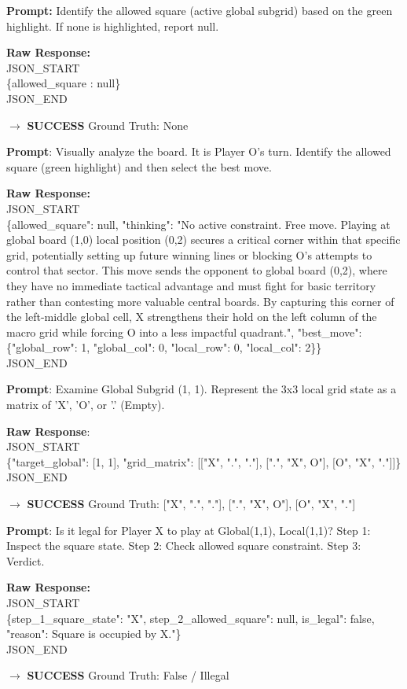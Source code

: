 \documentclass[12pt,a4paper]{article}
\begin{document}
	\begin{description}[leftmargin=3.5cm, style=sameline]
		\item [Allowed Square] \textbf{Prompt:} Identify the allowed square (active global subgrid) based on the green highlight. If none is highlighted, report null.
		\item \textbf{Raw Response:} \\ JSON\_START	\\ \{\dq allowed\_square \dq: null\} \\ JSON\_END
		\item $\rightarrow$ \textbf{SUCCESS} Ground Truth: None
		
		\newpage
		\item [Move] \textbf{Prompt}: Visually analyze the board. It is Player O's turn. Identify the allowed square (green highlight) and then select the best move.
		\item \textbf{Raw Response:} \\ JSON\_START \\ \{\dq allowed\_square": null, "thinking": "No active constraint. Free move. Playing at global board (1,0) local position (0,2) secures a critical corner within that specific grid, potentially setting up future winning lines or blocking O's attempts to control that sector. This move sends the opponent to global board (0,2), where they have no immediate tactical advantage and must fight for basic territory rather than contesting more valuable central boards. By capturing this corner of the left-middle global cell, X strengthens their hold on the left column of the macro grid while forcing O into a less impactful quadrant.", "best\_move": \{"global\_row": 1, "global\_col": 0, "local\_row": 0, "local\_col": 2\}\} \\ JSON\_END
		
		\item [State] \textbf{Prompt}: Examine Global Subgrid (1, 1). Represent the 3x3 local grid state as a matrix of 'X', 'O', or '.' (Empty).
		\item \textbf{Raw Response}: \\ JSON\_START \\ \{"target\_global": [1, 1], "grid\_matrix": [["X", ".", "."], [".", "X", \dq O"], [\dq O", "X", "."]]\} \\ JSON\_END
		\item $\rightarrow$  \textbf{SUCCESS} Ground Truth: ["X", ".", "."], [".", "X", \dq O"], [\dq O", "X", "."]
		\item [Legality] \textbf{Prompt}: Is it legal for Player X to play at Global(1,1), Local(1,1)? Step 1: Inspect the square state. Step 2: Check allowed square constraint. Step 3: Verdict.
		\item \textbf{Raw Response:} \\ JSON\_START \\ \{\dq step\_1\_square\_state": "X", \dq step\_2\_allowed\_square": null, \dq is\_legal": false, "reason": \dq Square is occupied by X."\} \\ JSON\_END
		\item $\rightarrow$  \textbf{SUCCESS} Ground Truth: False / Illegal
	\end{description}
	
\end{document}
